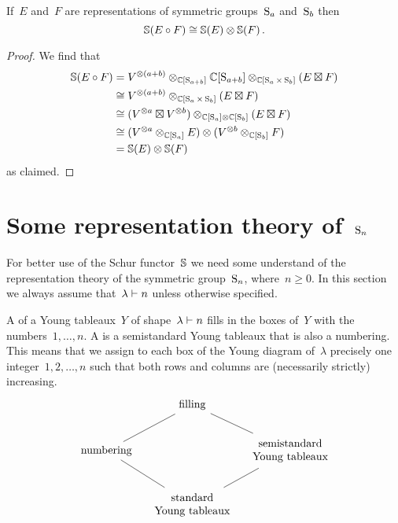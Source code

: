 \documentclass[a4paper,10pt]{scrartcl}
\begin{document}
\begin{lemma}
  \label{multiplicativity of schur functor}
  If~$E$ and~$F$ are representations of symmetric groups~$\operatorname{S}_a$ and~$\operatorname{S}_b$ then
  \[
    \mathbb{S}(E \circ F) \cong \mathbb{S}(E) \otimes \mathbb{S}(F) \,.
  \]
\end{lemma}

\begin{proof}
  We find that
  \begin{align*}
    \mathbb{S}(E \circ F)
    &=
    V^{\otimes (a+b)}
    \otimes_{\mathbb{C}[\operatorname{S}_{a+b}]}
    \mathbb{C}[\operatorname{S}_{a+b}]
    \otimes_{\mathbb{C}[\operatorname{S}_a \times \operatorname{S}_b]}
    (E \boxtimes F)
    \\
    &\cong
    V^{\otimes (a+b)}
    \otimes_{\mathbb{C}[\operatorname{S}_a \times \operatorname{S}_b]}
    (E \boxtimes F)
    \\
    &\cong
    (V^{\otimes a} \boxtimes V^{\otimes b})
    \otimes_{\mathbb{C}[\operatorname{S}_a] \otimes \mathbb{C}[\operatorname{S}_b]}
    (E \boxtimes F)
    \\
    &\cong
    (V^{\otimes a} \otimes_{\mathbb{C}[\operatorname{S}_a]} E)
    \otimes
    (V^{\otimes b} \otimes_{\mathbb{C}[\operatorname{S}_b]} F)
    \\
    &=
    \mathbb{S}(E) \otimes \mathbb{S}(F)
  \end{align*}
  as claimed.
\end{proof}





\section{Some representation theory of~$\operatorname{S}_n$}

For better use of the Schur functor~$\mathbb{S}$ we need some understand of the representation theory of the symmetric group~$\operatorname{S}_n$, where~$n \geq 0$.
In this section we always assume that~$\lambda \vdash n$ unless otherwise specified.

A  of a Young tableaux~$Y$ of shape~$\lambda \vdash n$ fills in the boxes of~$Y$ with the numbers~$1, \dotsc, n$.
A  is a semistandard Young tableaux that is also a numbering.
This means that we assign to each box of the Young diagram of~$\lambda$ precisely one integer~$1, 2, \dotsc, n$ such that both rows and columns are (necessarily strictly) increasing.
\[
  \begin{tikzcd}[column sep = small]
    {}
    &
    \text{filling}
    \arrow[dash]{dl}
    \arrow[dash]{dr}
    &
    {}
    \\
    \text{numbering}
    \arrow[dash]{dr}
    &
    {}
    &
    \begin{tabular}{@{}c@{}}
      semistandard \\
      Young tableaux
    \end{tabular}
    \arrow[dash]{dl}
    \\
    {}
    &
    \begin{tabular}{@{}c@{}}
      standard \\
      Young tableaux
    \end{tabular}
    &
    {}
  \end{tikzcd}
\]
\end{document}

